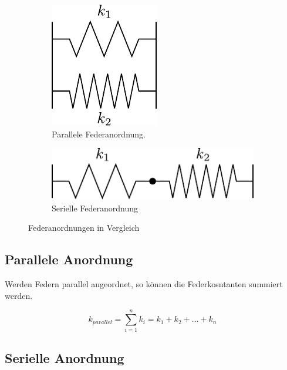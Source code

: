 \begin{figure}[h!]
	\centering
	\begin{subfigure}[c]{0.45\textwidth}
		\includegraphics[scale=0.75]{../fig/feder-parallel.pdf}
		\caption{Parallele Federanordnung.}
		\label{fig:feder-parallel}
	\end{subfigure}
	\begin{subfigure}[c]{0.45\textwidth}
		\includegraphics[scale=0.75]{../fig/feder-seriell.pdf}
		\caption{Serielle Federanordnung}
		\label{fig:feder-seriell}
	\end{subfigure}
	\caption{Federanordnungen in Vergleich}
	\label{fig:federanordnungen}
\end{figure}

\subsection{Parallele Anordnung}

\noindent
Werden Federn parallel angeordnet, so können die Federkosntanten summiert 
werden.

\[ \boxed{k_{parallel} 
	= \sum_{i=1}^n k_i 
	= k_1 + k_2 + \dots + k_n
} \]

\subsection{Serielle Anordnung}

